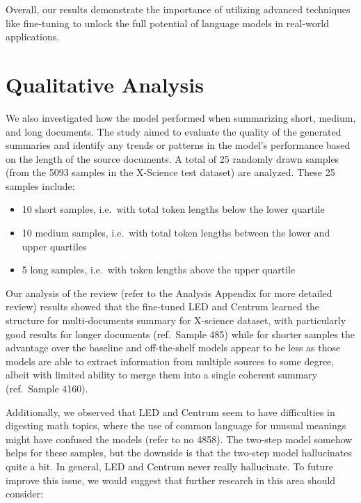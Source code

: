\documentclass[12pt, twocolumn]{article}
\numberwithin{equation}{section}
\begin{document}
Overall, our results demonstrate the importance of utilizing advanced techniques like fine-tuning to unlock the full potential of language models in real-world applications.

\section{Qualitative Analysis}
\label{app:qualitative}

We also investigated how the model performed when summarizing short, medium, and long documents. The study aimed to evaluate the quality of the generated summaries and identify any trends or patterns in the model's performance based on the length of the source documents. A total of 25 randomly drawn samples (from the 5093 samples in the X-Science test dataset) are analyzed.  These 25 samples include:

\begin{itemize}
    \item 10 short samples, i.e.~with total token lengths below the lower quartile
    \item 10 medium samples, i.e.~with total token lengths between the lower and upper quartiles
    \item 5 long samples, i.e.~with token lengths above the upper quartile
\end{itemize}

Our analysis of the review (refer to the Analysis Appendix for more detailed review) results showed that the fine-tuned LED and Centrum learned the structure for multi-documents summary for X-science dataset, with particularly good results for longer documents (ref.~Sample 485) while for shorter samples the advantage over the baseline and off-the-shelf models appear to be less as those models are able to extract information from multiple sources to some degree, albeit with limited ability to merge them into a single coherent summary (ref.~Sample 4160). 

Additionally, we observed that LED and Centrum seem to have difficulties in digesting math topics, where the use of common language for unusual meanings might have confused the models (refer to no 4858).  The two-step model somehow helps for these samples, but the downside is that the two-step model hallucinates quite a bit. In general, LED and Centrum never really hallucinate. To future improve this issue, we would suggest that further research in this area should consider:
\end{document}
